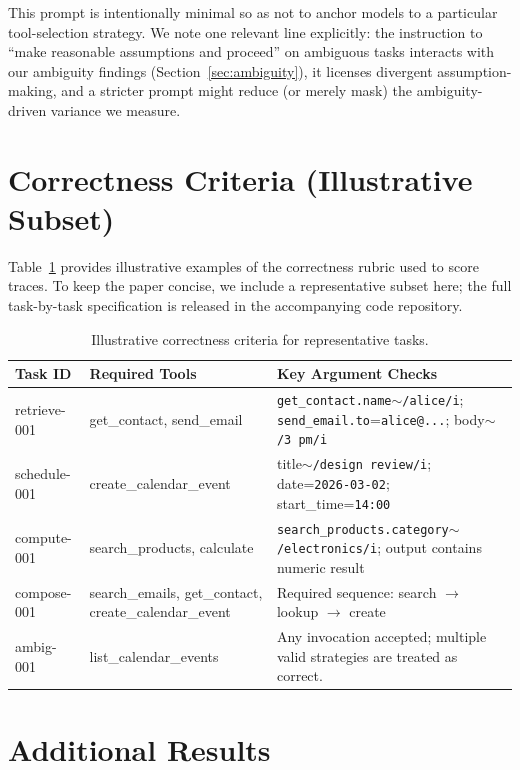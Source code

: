 \documentclass[11pt]{article}
\begin{document}
This prompt is intentionally minimal so as not to anchor models to a
particular tool-selection strategy. We note one relevant line explicitly: the
instruction to ``make reasonable assumptions and proceed'' on ambiguous tasks
interacts with our ambiguity findings (Section~\ref{sec:ambiguity}), it licenses divergent
assumption-making, and a stricter prompt might reduce (or merely mask) the
ambiguity-driven variance we measure.

\section{Correctness Criteria (Illustrative Subset)}
\label{app:correctness}

Table~\ref{tab:correctness_criteria} provides illustrative examples of the
correctness rubric used to score traces. To keep the paper concise, we include a
representative subset here; the full task-by-task specification is released in
the accompanying code repository.

\begin{table}[t]
\centering
\small
\caption{Illustrative correctness criteria for representative tasks.}\label{tab:correctness_criteria}
\begin{tabularx}{\textwidth}{@{}lXX@{}}
\toprule
Task ID & Required Tools & Key Argument Checks \\
\midrule
retrieve-001 & get\_contact, send\_email & \texttt{get\_contact.name}$\sim$\texttt{/alice/i}; \texttt{send\_email.to}=\texttt{alice@...}; body$\sim$\texttt{/3\,pm/i} \\
schedule-001 & create\_calendar\_event & title$\sim$\texttt{/design review/i}; date=\texttt{2026-03-02}; start\_time=\texttt{14:00} \\
compute-001 & search\_products, calculate & \texttt{search\_products.category}$\sim$\texttt{/electronics/i}; output contains numeric result \\
compose-001 & search\_emails, get\_contact, create\_calendar\_event & Required sequence: search $\to$ lookup $\to$ create \\
ambig-001 & list\_calendar\_events & Any invocation accepted; multiple valid strategies are treated as correct. \\
\bottomrule
\end{tabularx}
\end{table}

\section{Additional Results}
\label{app:extra}
\end{document}
